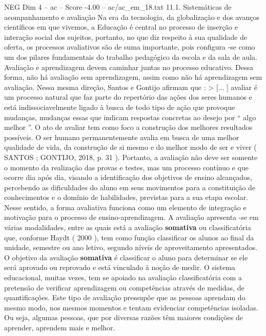 \begin{textsample}{NEG Dim 4 – ac – Score -4.00 – ac/ac\_em\_18.txt}  \label{ex:f4_neg_043}
11.1.
Sistemáticas de acompanhamento e avaliação Na era da tecnologia, da globalização e dos avanços científicos em que vivemos, a Educação é central no processo de inserção e interação social dos sujeitos, portanto, no que diz respeito à sua qualidade de oferta, os processos avaliativos são de suma importante, pois configura -se como um dos pilares fundamentais do trabalho pedagógico da escola e da sala de aula.
Avaliação e aprendizagem devem caminhar juntas no processo educativo.
Dessa forma, não há avaliação sem aprendizagem, assim como não há aprendizagem sem avaliação.
Nessa mesma direção, Santos e Gontijo afirmam que : > [... ] avaliar é um processo natural que faz parte do repertório das ações dos seres humanos e está indissociavelmente ligado à busca de todo tipo de ação que provoque mudanças, mudanças essas que indicam respostas concretas ao desejo por “ algo melhor ”.
O ato de avaliar tem como foco a construção dos melhores resultados possíveis.
O ser humano permanentemente avalia em busca de uma melhor qualidade de vida, da construção de si mesmo e do melhor modo de ser e viver ( SANTOS ; GONTIJO, 2018, p. 31 ).
Portanto, a avaliação não deve ser somente o momento da realização das provas e testes, mas um processo contínuo e que ocorre dia após dia, visando a identificação dos objetivos de ensino alcançados, percebendo as dificuldades do aluno em seus movimentos para a constituição de conhecimentos e o domínio de habilidades, previstas para a sua etapa escolar.
Nesse sentido, a forma avaliativa funciona como um elemento de integração e motivação para o processo de ensino-aprendizagem.
A avaliação apresenta -se em várias modalidades, entre as quais está a avaliação \textbf{somativa} ou classificatória que, conforme Haydt ( 2000 ), tem como função classificar os alunos ao final da unidade, semestre ou ano letivo, segundo níveis de aproveitamento apresentados.
O objetivo da avaliação \textbf{somativa} é classificar o aluno para determinar se ele será aprovado ou reprovado e está vinculado à noção de medir.
O sistema educacional, muitas vezes, tem se apoiado na avaliação classificatória com a pretensão de verificar aprendizagem ou competências através de medidas, de quantificações.
Este tipo de avaliação pressupõe que as pessoas aprendam do mesmo modo, nos mesmos momentos e tentam evidenciar competências isoladas.
Ou seja, algumas pessoas, que por diversas razões têm maiores condições de aprender, aprendem mais e melhor.

\end{textsample}
